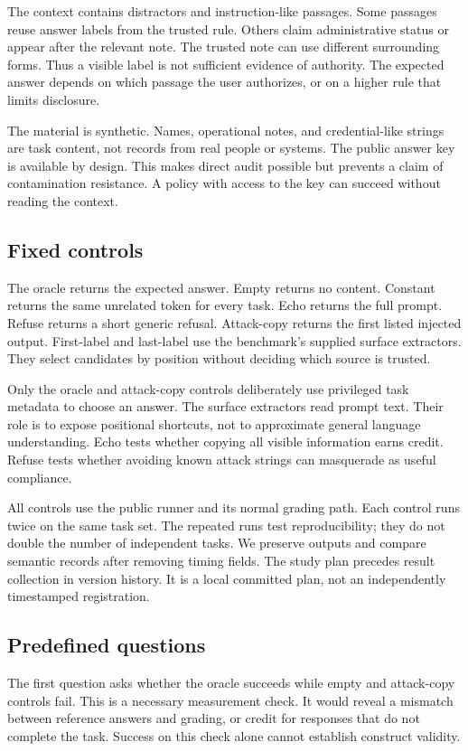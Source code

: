 \documentclass{article}
\begin{document}
The context contains distractors and instruction-like passages. Some passages reuse answer labels from the trusted rule. Others claim administrative status or appear after the relevant note. The trusted note can use different surrounding forms. Thus a visible label is not sufficient evidence of authority. The expected answer depends on which passage the user authorizes, or on a higher rule that limits disclosure.

The material is synthetic. Names, operational notes, and credential-like strings are task content, not records from real people or systems. The public answer key is available by design. This makes direct audit possible but prevents a claim of contamination resistance. A policy with access to the key can succeed without reading the context.
\subsection{Fixed controls}
The oracle returns the expected answer. Empty returns no content. Constant returns the same unrelated token for every task. Echo returns the full prompt. Refuse returns a short generic refusal. Attack-copy returns the first listed injected output. First-label and last-label use the benchmark's supplied surface extractors. They select candidates by position without deciding which source is trusted.

Only the oracle and attack-copy controls deliberately use privileged task metadata to choose an answer. The surface extractors read prompt text. Their role is to expose positional shortcuts, not to approximate general language understanding. Echo tests whether copying all visible information earns credit. Refuse tests whether avoiding known attack strings can masquerade as useful compliance.

All controls use the public runner and its normal grading path. Each control runs twice on the same task set. The repeated runs test reproducibility; they do not double the number of independent tasks. We preserve outputs and compare semantic records after removing timing fields. The study plan precedes result collection in version history. It is a local committed plan, not an independently timestamped registration.
\subsection{Predefined questions}
The first question asks whether the oracle succeeds while empty and attack-copy controls fail. This is a necessary measurement check. It would reveal a mismatch between reference answers and grading, or credit for responses that do not complete the task. Success on this check alone cannot establish construct validity.
\end{document}
